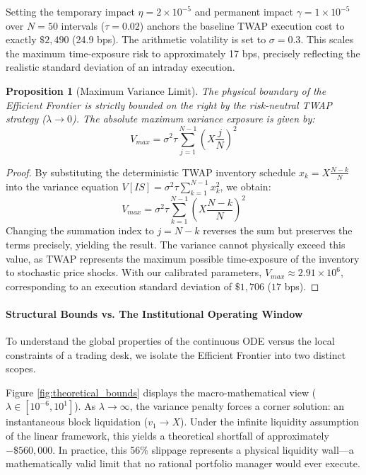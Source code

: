 \documentclass[11pt,a4paper]{article}
\newtheorem{proposition}[theorem]{Proposition}
\begin{document}
Setting the temporary impact $\eta = 2 \times 10^{-5}$ and permanent impact $\gamma = 1 \times 10^{-5}$ over $N=50$ intervals ($\tau=0.02$) anchors the baseline TWAP execution cost to exactly $\$2,490$ (24.9 bps). The arithmetic volatility is set to $\sigma = 0.3$. This scales the maximum time-exposure risk to approximately 17 bps, precisely reflecting the realistic standard deviation of an intraday execution.

\begin{proposition}[Maximum Variance Limit]
The physical boundary of the Efficient Frontier is strictly bounded on the right by the risk-neutral TWAP strategy ($\lambda \to 0$). The absolute maximum variance exposure is given by:
\[ V_{max} = \sigma^2 \tau \sum_{j=1}^{N-1} \left( X \frac{j}{N} \right)^2 \]
\end{proposition}

\begin{proof}
By substituting the deterministic TWAP inventory schedule $x_k = X \frac{N-k}{N}$ into the variance equation $V[IS] = \sigma^2 \tau \sum_{k=1}^{N-1} x_k^2$, we obtain:
\[ V_{max} = \sigma^2 \tau \sum_{k=1}^{N-1} \left( X \frac{N-k}{N} \right)^2 \]
Changing the summation index to $j = N-k$ reverses the sum but preserves the terms precisely, yielding the result. The variance cannot physically exceed this value, as TWAP represents the maximum possible time-exposure of the inventory to stochastic price shocks. With our calibrated parameters, $V_{max} \approx 2.91 \times 10^6$, corresponding to an execution standard deviation of $\$1,706$ ($17$ bps).
\end{proof}

\paragraph{Structural Bounds vs. The Institutional Operating Window}
To understand the global properties of the continuous ODE versus the local constraints of a trading desk, we isolate the Efficient Frontier into two distinct scopes. 

Figure \ref{fig:theoretical_bounds} displays the macro-mathematical view ($\lambda \in [10^{-6}, 10^1]$). As $\lambda \to \infty$, the variance penalty forces a corner solution: an instantaneous block liquidation ($v_1 \to X$). Under the infinite liquidity assumption of the linear framework, this yields a theoretical shortfall of approximately $-\$560,000$. In practice, this 56\% slippage represents a physical liquidity wall---a mathematically valid limit that no rational portfolio manager would ever execute.
\end{document}
